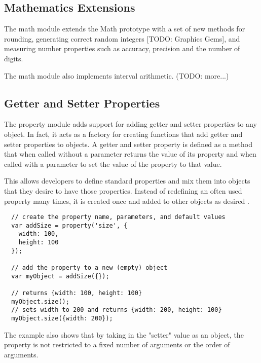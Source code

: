 \subsection{Mathematics Extensions}
The math module extends the Math prototype with a set of new methods for rounding, generating correct random integers [TODO: Graphics Gems], and measuring number properties such as accuracy, precision and the number of digits.

The math module also implements interval arithmetic. (TODO: more...)

\subsection{Getter and Setter Properties}
The property module adds support for adding getter and setter properties to any object. In fact, it acts as a factory for creating functions that add getter and setter properties to objects. A getter and setter property is defined as a method that when called without a parameter returns the value of its property and when called with a parameter to set the value of the property to that value.

This allows developers to define standard properties and mix them into objects that they desire to have those properties. Instead of redefining an often used property many times, it is created once and added to other objects as desired \cite{crockford08}.
\begin{verbatim}
  // create the property name, parameters, and default values
  var addSize = property('size', {
    width: 100,
    height: 100
  });

  // add the property to a new (empty) object
  var myObject = addSize({});

  // returns {width: 100, height: 100}
  myObject.size(); 
  // sets width to 200 and returns {width: 200, height: 100}
  myObject.size({width: 200});
\end{verbatim}
The example also shows that by taking in the "setter" value as an object, the property is not restricted to a fixed number of arguments or the order of arguments.

